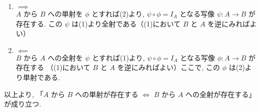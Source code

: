 \begin{nmprob}
{\item
\begin{enumerate}
    \item $\implies$\\
    $A$ から $B$ への単射を $\phi$ とすれば(2)より, $\psi \circ \phi = I_A$ となる写像 $\psi : A \to B$ が存在する.
    この $\psi$ は(1)より全射である（(1)において $B$ と $A$ を逆にみればよい）
    \item $\impliedby$\\
    $B$ から $A$ への全射を $\psi$ とすれば(1)より, $\psi \circ \phi = I_A$ となる写像 $\phi : A \to B$ が存在する
    （(1)において $B$ と $A$ を逆にみればよい）ここで, この $\phi$ は(2)より単射である.
\end{enumerate}
以上より, 「$A$ から $B$ への単射が存在する $\iff$ $B$ から $A$ への全射が存在する」が成り立つ.
}
\end{nmprob}



